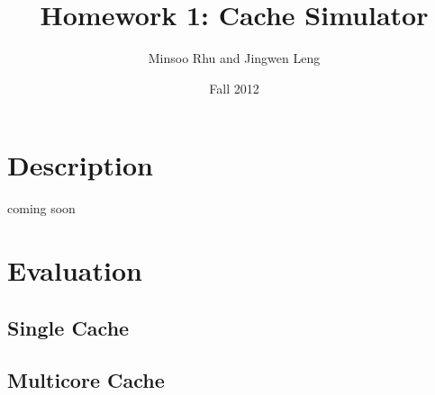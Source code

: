 \documentclass[12pt]{report}
\begin{document}

\title{Homework 1: Cache Simulator}
\author{Minsoo Rhu and Jingwen Leng}
\date{Fall 2012}
\maketitle


\section{Description}
 coming soon

\section{Evaluation}
\subsection{Single Cache}

\subsection{Multicore Cache}
\end{document}
